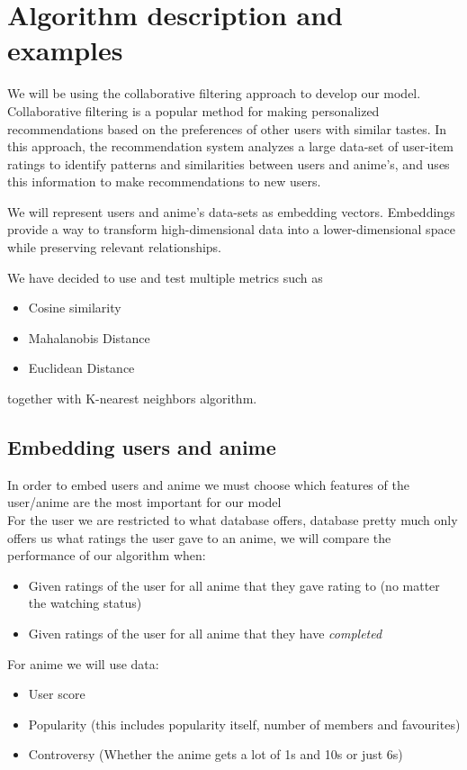 \section{Algorithm description and examples}

We will be using the collaborative filtering approach to develop our model. \\ 
Collaborative filtering is a popular method for making personalized recommendations based on the preferences of other users with similar tastes. In this approach, the recommendation system analyzes a large data-set of user-item ratings to identify patterns and similarities between users and anime's, and uses this information to make recommendations to new users.

We will represent users and anime's data-sets as embedding vectors. Embeddings provide a way to transform high-dimensional data into a lower-dimensional space while preserving relevant relationships.

We have decided to use and test multiple metrics such as
\begin{itemize} 
    \item Cosine similarity
    \item Mahalanobis Distance
    \item Euclidean Distance
\end{itemize}
together with K-nearest neighbors algorithm. \\ 

\subsection{Embedding users and anime}
In order to embed users and anime we must choose which features of the user/anime are the most important for our model \\ 
For the user we are restricted to what database offers, database pretty much only offers us what ratings the user gave to an anime, we will compare the performance of our algorithm when:
\begin{itemize} 
\item Given ratings of the user for all anime that they gave rating to (no matter the watching status)
\item Given ratings of the user for all anime that they have \emph{completed}
\end{itemize}

For anime we will use data: 
\begin{itemize}
    \item User score 
    \item Popularity (this includes popularity itself, number of members and favourites)
    \item Controversy (Whether the anime gets a lot of 1s and 10s or just 6s)
\end{itemize}

